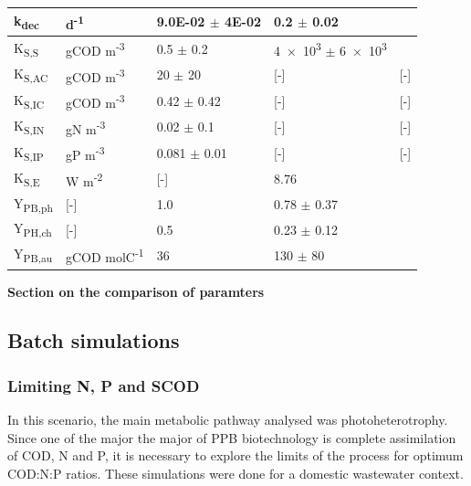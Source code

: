 \begin{table}[tp]
\begin{tabular}{@{}p{2cm} p{3cm} p{4cm} p{4cm} p{3cm} @{}}
        k\textsubscript{dec} & d\textsuperscript{-1} & \num{9.0E-02} $\pm$ \num{4E-02}& \num{0.2} $\pm$ 0.02&  \cite{Huang1999, Huang2001}\\
        \hline
        K\textsubscript{S,S} & gCOD m\textsuperscript{-3} & \num{0.5} $\pm$ \num{0.2} & \num{4e3} $\pm$ \num{6e3}& \cite{Gadhamshetty2008, Obeid2009a}\\
        K\textsubscript{S,AC} & gCOD m\textsuperscript{-3} & \num{20} $\pm$ \num{20} & [-] &[-] \\
        K\textsubscript{S,IC} & gCOD m\textsuperscript{-3} & \num{.42} $\pm$  \num{.42} & [-] &[-] \\
        K\textsubscript{S,IN} & gN m\textsuperscript{-3} &\num{0.02} $\pm$ \num{0.1} & [-]&[-] \\
        K\textsubscript{S,IP} & gP m\textsuperscript{-3} &\num{0.081} $\pm$ \num{0.01} &[-] &[-] \\
        K\textsubscript{S,E} & W m\textsuperscript{-2} & [-] & \num{8.76} & \cite{Eltsova2016} \\
        \hline
        Y\textsubscript{PB,ph} &[-] & 1.0 & \num{0.78} $\pm$ \num{0.37}& \cite{Gadhamshetty2008, Klamt2002, Klein1991, McKinlay2011, Obeid2009a, Schultz1982} \\
        Y\textsubscript{PH,ch} &[-] & \num{0.5} &\num{0.23} $\pm$ \num{0.12} &  \cite{Madigan1978, Schultz1982}\\
        Y\textsubscript{PB,au} &gCOD molC\textsuperscript{-1} &36 & 130 $\pm$ 80 & \cite{Wang1993} \\
        \bottomrule
    \end{tabular}
    \label{tab:bioparams}
\end{table}

\textbf{Section on the comparison of paramters}

\subsection{Batch simulations}

\subsubsection{Limiting N, P and SCOD}
In this scenario, the main metabolic pathway analysed was photoheterotrophy. Since one of the major the major of PPB biotechnology is complete assimilation of COD, N and P, it is necessary to explore the limits of the process for optimum COD:N:P ratios. These simulations were done for a domestic wastewater context.

